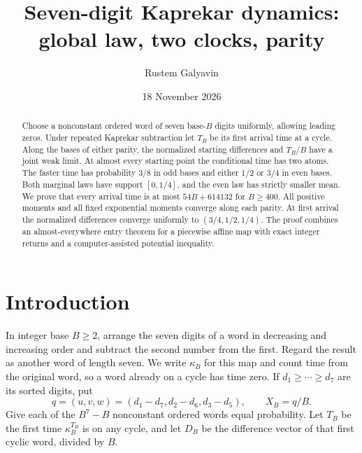 \documentclass[11pt,reqno]{amsart}
\title[Seven-digit Kaprekar dynamics]{Seven-digit Kaprekar dynamics:\\ global law, two clocks, parity}
\author{Rustem Galyavin}
\date{18 November 2026}
\begin{document}
\begin{abstract}
Choose a nonconstant ordered word of seven base-$B$ digits uniformly, allowing
leading zeros. Under repeated Kaprekar subtraction let $T_B$ be its first arrival
time at a cycle. Along the bases of either parity, the normalized starting differences
and $T_B/B$ have a joint weak limit. At almost every starting point the
conditional time has two atoms. The faster time has probability $3/8$ in odd
bases and either $1/2$ or $3/4$ in even bases. Both marginal laws have support
$[0,1/4]$, and the even law has strictly smaller mean. We prove that every
arrival time is at most $54B+614132$ for $B\ge400$. All positive moments
and all fixed exponential moments converge along each parity. At first
arrival the normalized differences converge uniformly to $(3/4,1/2,1/4)$.
The proof combines an almost-everywhere entry theorem for a piecewise affine
map with exact integer returns and a computer-assisted potential inequality.
\end{abstract}
\maketitle
\section{Introduction}
In integer base $B\ge2$, arrange the seven digits of a word in decreasing
and increasing order and subtract the second number from the first.
Regard the result as another word of length seven. We write $\kappa_B$ for
this map and count time from the original word, so a word already on a cycle
has time zero. If $d_1\ge\cdots\ge d_7$ are its sorted digits, put
\[
 q=(u,v,w)=(d_1-d_7,d_2-d_6,d_3-d_5),\qquad X_B=q/B.
\]
Give each of the $B^7-B$ nonconstant ordered words equal probability. Let
$T_B$ be the first time $\kappa_B^{T_B}$ is on any cycle, and let $D_B$ be
the difference vector of that first cyclic word, divided by $B$.
\end{document}
